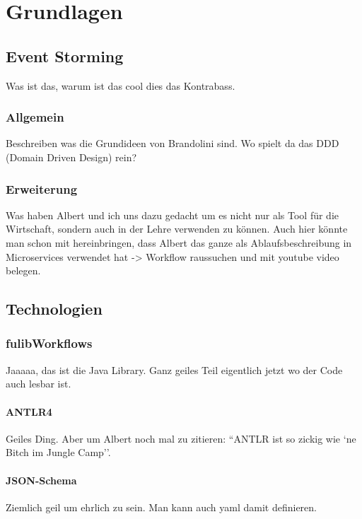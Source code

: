 \chapter{Grundlagen}\label{ch:technologien}
\section{Event Storming}\label{sec:event-storming}
Was ist das, warum ist das cool dies das Kontrabass.

\subsection{Allgemein}\label{subsec:allgemein}
Beschreiben was die Grundideen von Brandolini sind.
Wo spielt da das DDD (Domain Driven Design) rein?

\subsection{Erweiterung}\label{subsec:erweiterung}
Was haben Albert und ich uns dazu gedacht um es nicht nur als Tool für die Wirtschaft, sondern
auch in der Lehre verwenden zu können.
Auch hier könnte man schon mit hereinbringen, dass Albert das ganze als Ablaufsbeschreibung in
Microservices verwendet hat -> Workflow raussuchen und mit youtube video belegen.

\section{Technologien}\label{sec:technologien}

\subsection{fulibWorkflows}\label{subsec:fulibworkflows}
Jaaaaa, das ist die Java Library.
Ganz geiles Teil eigentlich jetzt wo der Code auch lesbar ist.

\subsubsection{ANTLR4}\label{subsubsec:antlr4}
Geiles Ding.
Aber um Albert noch mal zu zitieren: ``ANTLR ist so zickig wie `ne Bitch im Jungle Camp''.

\subsubsection{JSON-Schema}\label{subsubsec:json-schema}
Ziemlich geil um ehrlich zu sein.
Man kann auch yaml damit definieren.

